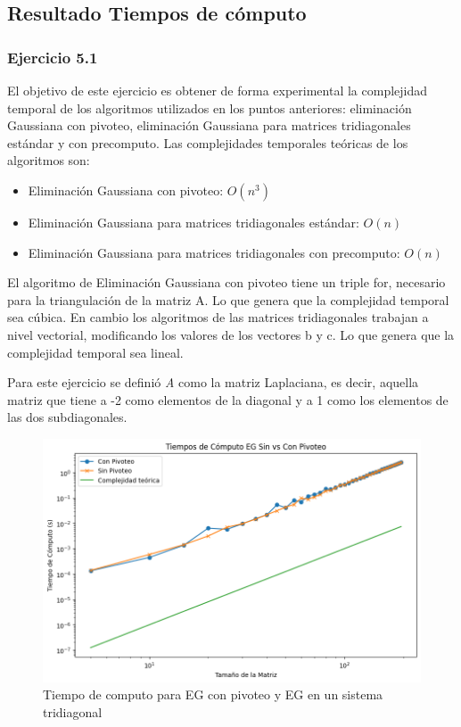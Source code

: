 \subsection{Resultado Tiempos de cómputo}
\label{resultados tiempo}
\subsubsection{Ejercicio 5.1}
El objetivo de este ejercicio es obtener de forma experimental la complejidad temporal de los algoritmos utilizados en los puntos anteriores: eliminación Gaussiana con pivoteo, eliminación Gaussiana para matrices tridiagonales estándar y con precomputo. Las complejidades temporales teóricas de los algoritmos son:

\begin{itemize}
    \item Eliminación Gaussiana con pivoteo: $O(n^{3})$
    \item Eliminación Gaussiana para matrices tridiagonales estándar: $O(n)$
    \item Eliminación Gaussiana para matrices tridiagonales con precomputo: $O(n)$
\end{itemize}

El algoritmo de Eliminación Gaussiana con pivoteo tiene un triple for, necesario para la triangulación de la matriz A. Lo que genera que la complejidad temporal sea cúbica. En cambio los algoritmos de las matrices tridiagonales trabajan a nivel vectorial, modificando los valores de los vectores b y c. Lo que genera que la complejidad temporal sea lineal.

Para este ejercicio se definió \textit{A} como la matriz Laplaciana, es decir, aquella matriz que tiene a -2 como elementos de la diagonal y a 1 como los elementos de las dos subdiagonales.

\begin{figure}[H]
\centerline{\includegraphics[scale=0.45]{./img/tiempos_EGsinVsConPivoteo.png}}
\caption{Tiempo de computo para EG con pivoteo y EG en un sistema tridiagonal}
\label{result_ej5}
\end{figure}

